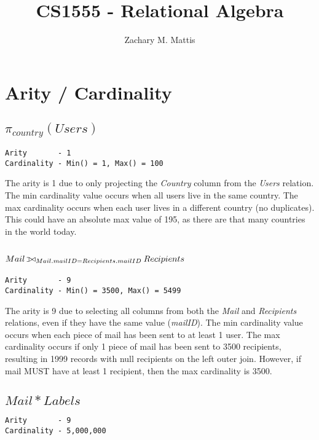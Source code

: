 \documentclass[12pt, letterpaper]{report}
\title{CS1555 - Relational Algebra}
\author{Zachary M. Mattis}
\def\ojoin{\setbox0=\hbox{$\bowtie$}
\rule[-.02ex]{.25em}{.4pt}\llap{\rule[\ht0]{.25em}{.4pt}}}
\def\leftouterjoin{\mathbin{\ojoin\mkern-5.8mu\bowtie}}
\begin{document}
	
\maketitle


\section{Arity / Cardinality}

\subsection{$\pi_{country}(Users)$}

\begin{verbatim}
Arity       - 1
Cardinality - Min() = 1, Max() = 100
\end{verbatim}

The arity is 1 due to only projecting the \textit{Country} column from the \textit{Users} relation. The min cardinality value occurs when all users live in the same country. The max cardinality occurs when each user lives in a different country (no duplicates). This could have an absolute max value of 195, as there are that many countries in the world today.

\subsection{$Mail \leftouterjoin_{Mail.mailID=Recipients.mailID} Recipients$}

\begin{verbatim}
Arity       - 9
Cardinality - Min() = 3500, Max() = 5499
\end{verbatim}

The arity is 9 due to selecting all columns from both the \textit{Mail} and \textit{Recipients} relations, even if they have the same value (\textit{mailID}). The min cardinality value occurs when each piece of mail has been sent to at least 1 user. The max cardinality occurs if only 1 piece of mail has been sent to 3500 recipients, resulting in 1999 records with null recipients on the left outer join. However, if mail MUST have at least 1 recipient, then the max cardinality is 3500.

\subsection{$Mail * Labels$}

\begin{verbatim}
Arity       - 9
Cardinality - 5,000,000
\end{verbatim}
\end{document}

